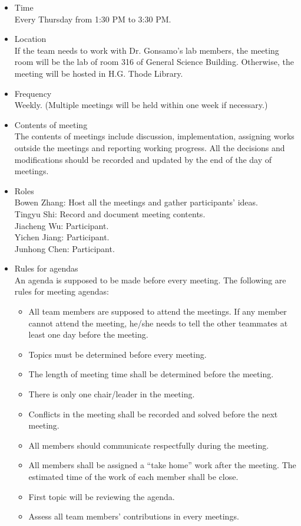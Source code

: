 \documentclass{article}
\begin{document}
\begin{itemize}
    \item Time\\ Every Thursday from 1:30 PM to 3:30 PM.
    \item Location \\ If the team needs to work with Dr. Gonsamo's lab members, the meeting room
    will be the lab of room 316 of General Science Building. Otherwise, the meeting will be hosted in H.G. Thode Library.
    \item Frequency \\ Weekly. (Multiple meetings will be held within one week if necessary.)
    \item Contents of meeting\\
    The contents of meetings include discussion, implementation, assigning works outside 
    the meetings and reporting working progress. All the decisions and modifications
    should be recorded and updated by the end of the day of meetings.
    \item Roles\\ 
    Bowen Zhang: Host all the meetings and gather participants' ideas.\\
    Tingyu Shi: Record and document meeting contents.\\
    Jiacheng Wu: Participant.\\
    Yichen Jiang: Participant.\\
    Junhong Chen: Participant.
    \item Rules for agendas\\
    An agenda is supposed to be made before every meeting. The following are rules for
    meeting agendas:
    \begin{itemize}
    \item All team members are supposed to attend the meetings. If any member cannot attend the meeting, he/she needs to tell the other teammates at least one day before the meeting.
    \item Topics must be determined before every meeting.
    \item The length of meeting time shall be determined before the meeting.
    \item There is only one chair/leader in the meeting.
    \item Conflicts in the meeting shall be recorded and solved before the next meeting.
    \item All members should communicate respectfully during the meeting.
    \item All members shall be assigned a “take home” work after the meeting. The estimated time of the work of each member shall be close.
    \item First topic will be reviewing the agenda.
    \item Assess all team members’ contributions in every meetings.
    \end{itemize}
\end{itemize}
\end{document}
